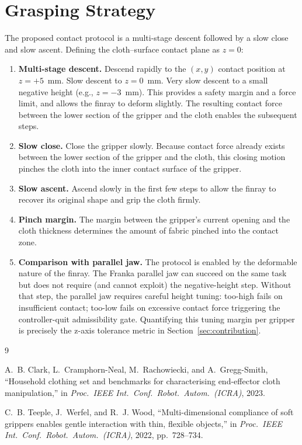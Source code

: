 \documentclass[10pt,letterpaper]{article}
\begin{document}
\section{Grasping Strategy}
\label{sec:strategy}
The proposed contact protocol is a multi-stage descent followed by a
slow close and slow ascent. Defining the cloth--surface contact plane
as $z = 0$:
\begin{enumerate}[leftmargin=*,nosep]
    \item \textbf{Multi-stage descent.} Descend rapidly to the $(x, y)$
          contact position at $z = +5$~mm. Slow descent to $z = 0$~mm.
          Very slow descent to a small negative height (e.g.,
          $z = -3$~mm). This provides a safety margin and a force
          limit, and allows the finray to deform slightly. The
          resulting contact force between the lower section of the
          gripper and the cloth enables the subsequent steps.
    \item \textbf{Slow close.} Close the gripper slowly. Because
          contact force already exists between the lower section of
          the gripper and the cloth, this closing motion pinches the
          cloth into the inner contact surface of the gripper.
    \item \textbf{Slow ascent.} Ascend slowly in the first few steps to
          allow the finray to recover its original shape and grip the
          cloth firmly.
    \item \textbf{Pinch margin.} The margin between the gripper's
          current opening and the cloth thickness determines the
          amount of fabric pinched into the contact zone.
    \item \textbf{Comparison with parallel jaw.} The protocol is
          enabled by the deformable nature of the finray. The Franka
          parallel jaw can succeed on the same task but does not
          require (and cannot exploit) the negative-height step.
          Without that step, the parallel jaw requires careful
          height tuning: too-high fails on insufficient contact;
          too-low fails on excessive contact force triggering the
          controller-quit admissibility gate. Quantifying this
          tuning margin per gripper is precisely the z-axis tolerance
          metric in Section~\ref{sec:contribution}.
\end{enumerate}

\begin{thebibliography}{9}

A.~B. Clark, L.~Cramphorn-Neal, M.~Rachowiecki, and A.~Gregg-Smith,
``Household clothing set and benchmarks for characterising end-effector
cloth manipulation,'' in \emph{Proc.\ IEEE Int.\ Conf.\ Robot.\ Autom.\
(ICRA)}, 2023.

C.~B. Teeple, J.~Werfel, and R.~J. Wood,
``Multi-dimensional compliance of soft grippers enables gentle
interaction with thin, flexible objects,'' in \emph{Proc.\ IEEE Int.\
Conf.\ Robot.\ Autom.\ (ICRA)}, 2022, pp.~728--734.

\end{thebibliography}
\end{document}
